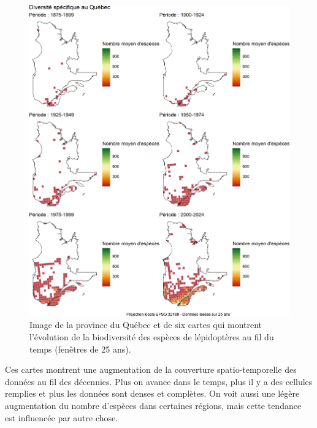 \documentclass[9pt,twocolumn,twoside,]{pnas-new}
\begin{document}
\begin{figure}

\includegraphics[width=1\linewidth]{../Figures_analyse/cartes_combinees} \hfill{}

\caption{Image de la province du Québec et de six cartes qui montrent l'évolution de la biodiversité des espèces de lépidoptères au fil du temps (fenêtres de 25 ans).}\label{fig:fig_cartes_combinees, fullpage-figure}
\end{figure}

Ces cartes montrent une augmentation de la couverture spatio-temporelle
des données au fil des décennies. Plus on avance dans le temps, plus il
y a des cellules remplies et plus les données sont denses et complètes.
On voit aussi une légère augmentation du nombre d'espèces dans certaines
régions, mais cette tendance est influencée par autre chose.
\end{document}
